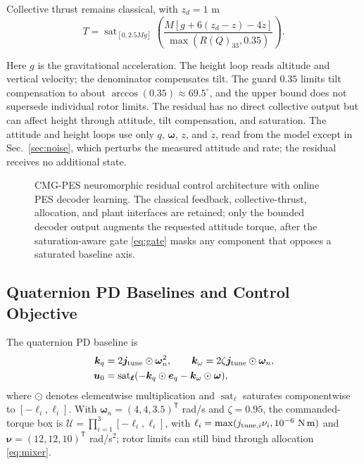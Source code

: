 \documentclass[letterpaper, 10 pt, conference]{ieeeconf}
\newcommand{\T}{^{\mathsf T}}
\newcommand{\sat}{\operatorname{sat}}
\begin{document}
Collective thrust remains classical, with $z_d=1$ m
\begin{equation}
 T=\sat_{[0,2.5Mg]}
 \left(\frac{M[g+6(z_d-z)-4\dot z]}{\max(R(Q)_{33},0.35)}\right).
 \label{eq:collective}
\end{equation}

Here $g$ is the gravitational acceleration. The height loop reads altitude and vertical velocity; the denominator compensates tilt. The guard $0.35$ limits tilt compensation to about $\arccos(0.35)\approx69.5^\circ$, and the upper bound does not supersede individual rotor limits. The residual has no direct collective output but can affect height through attitude, tilt compensation, and saturation. The attitude and height loops use only $q$, $\bm\omega$, $z$, and $\dot z$, read from the model except in Sec.~\ref{sec:noise}, which perturbs the measured attitude and rate; the residual receives no additional state.

\begin{figure}[!th]
    \centering
    \resizebox{0.84\textwidth}{!}{}
    \caption{CMG-PES neuromorphic residual control architecture with online PES decoder learning. The classical feedback, collective-thrust, allocation, and plant interfaces are retained; only the bounded decoder output augments the requested attitude torque, after the saturation-aware gate \eqref{eq:gate} masks any component that opposes a saturated baseline axis.}
    \label{fig:arch}
\end{figure}

\subsection{Quaternion PD Baselines and Control Objective}

The quaternion PD baseline is
\begin{align}
 \bm k_q&=2\bm j_{\rm tune}\odot\bm\omega_n^2,\qquad
 \bm k_\omega=2\zeta\bm j_{\rm tune}\odot\bm\omega_n,\\
 \bm u_0&=\sat_{\bm\ell}(-\bm k_q\odot\bm e_q-\bm k_\omega\odot\bm\omega),
 \label{eq:pd}
\end{align}
where $\odot$ denotes elementwise multiplication and $\sat_{\bm\ell}$ saturates componentwise to $[-\ell_i,\ell_i]$. With $\bm\omega_n=(4,4,3.5)\T$ rad/s and $\zeta=0.95$, the commanded-torque box is $\mathcal U=\prod_{i=1}^3[-\ell_i,\ell_i]$, with $\ell_i=\max(j_{{\rm tune},i}\nu_i,10^{-6}\ \mathrm{N\,m})$ and $\bm\nu=(12,12,10)\T$ rad/s$^2$; rotor limits can still bind through allocation \eqref{eq:mixer}.
\end{document}
